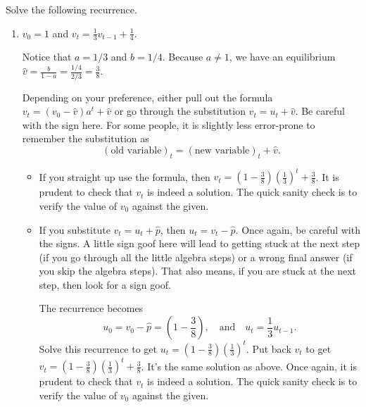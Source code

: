 \documentclass[../main.tex]{subfiles}
\begin{document}
\begin{exercise}
  Solve the following recurrence.
  \begin{enumerate}
    \item \(v_{0} = 1\) and \(v_{t} = \frac{1}{3} v_{t-1} + \frac{1}{4}\).
      \begin{solution}
        Notice that \(a = 1/3\) and \(b = 1/4\). Because \(a \ne 1\), we have an equilibrium \(\hat{v} = \frac{b}{1-a} = \frac{1/4}{2/3} = \frac{3}{8}\).  

        Depending on your preference, either pull out the formula \(v_{t} = (v_{0} - \hat{v}) a^{t} + \hat{v}\) or go through the substitution \(v_{t} = u_{t} + \hat{v}\).  Be careful with the sign here. For some people, it is slightly less error-prone to remember the substitution as 
        \[
          (\text{old variable})_{t} = (\text{new variable})_{t} + \hat{v}.
        \]

        \begin{itemize}
          \item If you straight up use the formula, then \(v_{t} = \left(1 - \frac{3}{8}\right) \left( \frac{1}{3} \right)^{t} + \frac{3}{8}\). It is prudent to check that \(v_{t}\) is indeed a solution.  The quick sanity check is to verify the value of \(v_{0}\) against the given.

          \item If you substitute \(v_{t} = u_{t} + \hat{p}\), then \(u_{t} = v_{t} - \hat{p}\). Once again, be careful with the signs. A little sign goof here will lead to getting stuck at the next step (if you go through all the little algebra steps) or a wrong final answer (if you skip the algebra steps). That also means, if you are stuck at the next step, then look for a sign goof. 

            The recurrence becomes
            \[
              u_{0} = v_{0} - \hat{p} = \left(1 - \frac{3}{8}\right), \quad\text{and}\quad u_{t} = \frac{1}{3} u_{t-1}.
            \]
            Solve this recurrence to get \(u_{t} =\left(1 - \frac{3}{8}\right) \left(\frac{1}{3}\right)^{t}\). Put back \(v_{t}\) to get \(v_{t} = \left(1 - \frac{3}{8}\right) \left( \frac{1}{3} \right)^{t} + \frac{3}{8}\). It's the same solution as above. Once again, it is prudent to check that \(v_{t}\) is indeed a solution.  The quick sanity check is to verify the value of \(v_{0}\) against the given.
        \end{itemize}

      \end{solution}


\end{enumerate}
\end{exercise}
\end{document}
